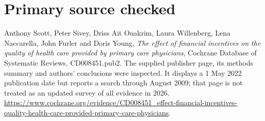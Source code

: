 \documentclass[11pt]{article}
\begin{document}
\section*{Primary source checked}
Anthony Scott, Peter Sivey, Driss Ait Ouakrim, Laura Willenberg, Lena Naccarella, John Furler and Doris Young, \emph{The effect of financial incentives on the quality of health care provided by primary care physicians}, Cochrane Database of Systematic Reviews, CD008451.pub2. The supplied publisher page, its methods summary and authors' conclusions were inspected. It displays a 1 May 2022 publication date but reports a search through August 2009; that page is not treated as an updated survey of all evidence in 2026. \url{https://www.cochrane.org/evidence/CD008451_effect-financial-incentives-quality-health-care-provided-primary-care-physicians}.
\end{document}
